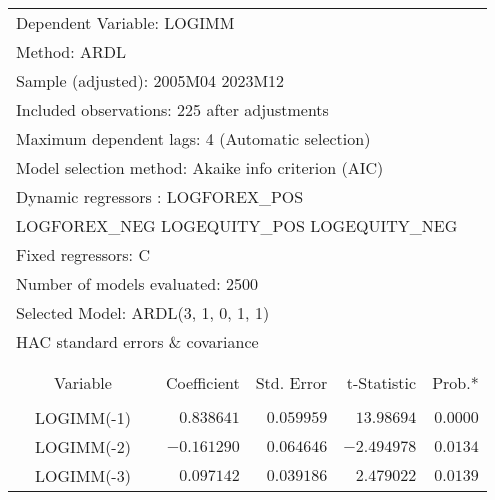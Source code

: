\begin{tabular}{lrrrr}
\multicolumn{2}{l}{Dependent Variable: LOGIMM}&\multicolumn{1}{c}{}&\multicolumn{1}{c}{}&\multicolumn{1}{c}{}\\
\multicolumn{1}{l}{Method: ARDL}&\multicolumn{1}{c}{}&\multicolumn{1}{c}{}&\multicolumn{1}{c}{}&\multicolumn{1}{c}{}\\
\multicolumn{3}{l}{Sample (adjusted): 2005M04 2023M12}&\multicolumn{1}{c}{}&\multicolumn{1}{c}{}\\
\multicolumn{4}{l}{Included observations: 225 after adjustments}&\multicolumn{1}{c}{}\\
\multicolumn{4}{l}{Maximum dependent lags: 4 (Automatic selection)}&\multicolumn{1}{c}{}\\
\multicolumn{4}{l}{Model selection method: Akaike info criterion (AIC)}&\multicolumn{1}{c}{}\\
\multicolumn{5}{l}{Dynamic regressors : LOGFOREX\_POS}\\
\multicolumn{5}{l}{LOGFOREX\_NEG  LOGEQUITY\_POS LOGEQUITY\_NEG}\\
\multicolumn{1}{l}{Fixed regressors: C}&\multicolumn{1}{c}{}&\multicolumn{1}{c}{}&\multicolumn{1}{c}{}&\multicolumn{1}{c}{}\\
\multicolumn{3}{l}{Number of models evaluated: 2500}&\multicolumn{1}{c}{}&\multicolumn{1}{c}{}\\
\multicolumn{3}{l}{Selected Model: ARDL(3, 1, 0, 1, 1)}&\multicolumn{1}{c}{}&\multicolumn{1}{c}{}\\
\multicolumn{6}{l}{HAC standard errors \& covariance} \\{}&\multicolumn{1}{c}{}&\multicolumn{1}{c}{} \\
[4.5pt] \hline \\ [-4.5pt]
\multicolumn{1}{c}{Variable}&\multicolumn{1}{r}{Coefficient}&\multicolumn{1}{r}{Std. Error}&\multicolumn{1}{r}{t-Statistic}&\multicolumn{1}{r}{Prob.*}\\
[4.5pt] \hline \\ [-4.5pt]
\multicolumn{1}{c}{LOGIMM(-1)}&\multicolumn{1}{r}{$0.838641$}&\multicolumn{1}{r}{$0.059959$}&\multicolumn{1}{r}{$13.98694$}&\multicolumn{1}{r}{$0.0000$}\\
\multicolumn{1}{c}{LOGIMM(-2)}&\multicolumn{1}{r}{$-0.161290$}&\multicolumn{1}{r}{$0.064646$}&\multicolumn{1}{r}{$-2.494978$}&\multicolumn{1}{r}{$0.0134$}\\
\multicolumn{1}{c}{LOGIMM(-3)}&\multicolumn{1}{r}{$0.097142$}&\multicolumn{1}{r}{$0.039186$}&\multicolumn{1}{r}{$2.479022$}&\multicolumn{1}{r}{$0.0139$}\\

\end{tabular}
